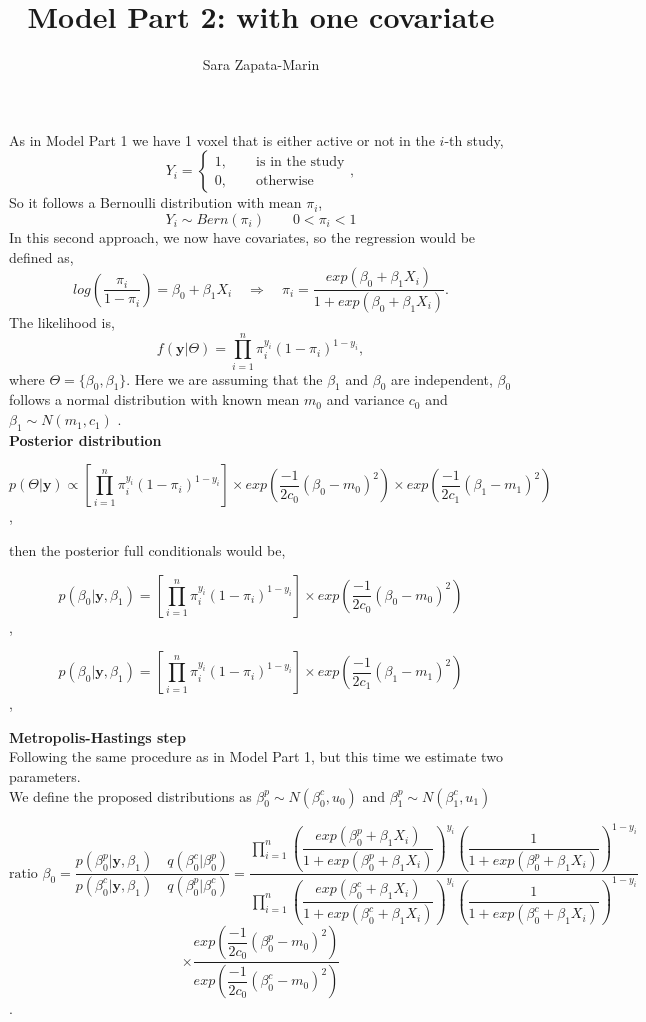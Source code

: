 \documentclass[10pt,a4paper]{article}
\author{Sara Zapata-Marin}
\title{Model Part 2: with one covariate}
\begin{document}
\maketitle

As in Model Part 1 we have  1 voxel that is either active or not in the $i$-th study,
\[ Y_i= 
\begin{cases}
1,\qquad \text{is in the study}\\
0, \qquad \text{otherwise}
\end{cases},
\]
So it follows a Bernoulli distribution with mean $\pi_i$,
\[Y_i \sim Bern(\pi_i) \qquad 0<\pi_i <1\]
In this second approach, we now have covariates, so the regression would be defined as,
\[ log \left(\dfrac{\pi_i}{1-\pi_i} \right)=\beta_0+\beta_1 X_{i} \quad \Rightarrow  \quad \pi_i = \dfrac{exp(\beta_0+\beta_1 X_{i}) }{1+ exp(\beta_0+\beta_1 X_{i} )}. \]
The likelihood is,
\[ f(\textbf{y}| \Theta)=\prod_{i=1}^{n} \pi_i^{y_i}(1-\pi_i)^{1-y_i},\]
where $\Theta =\{ \beta_0, \beta_{1}\}$. Here we are assuming that the $\beta_1$ and $\beta_0$  are independent, $\beta_0$ follows a normal distribution with known mean $m_0$ and variance $c_0$ and $\beta_1 \sim N(m_1, c_1) $ .
\\  \textbf{Posterior distribution} 

\[p(\Theta|\textbf{y})\propto \left[ \prod_{i=1}^{n} \pi_i^{y_i}(1-\pi_i)^{1-y_i} \right] \times exp\left(\dfrac{-1}{2c_0}(\beta_0-m_0)^2\right) \times exp \left( \dfrac{-1}{2c_1} (\beta_1-m_1)^2\right) \],

then the posterior full conditionals would be,

\[p(\beta_0|\textbf{y}, \beta_1)= \left[ \prod_{i=1}^{n} \pi_i^{y_i}(1-\pi_i)^{1-y_i} \right] \times exp\left(\dfrac{-1}{2c_0}(\beta_0-m_0)^2\right)\],

\[p(\beta_0|\textbf{y}, \beta_1)= \left[ \prod_{i=1}^{n} \pi_i^{y_i}(1-\pi_i)^{1-y_i} \right] \times exp\left(\dfrac{-1}{2c_1}(\beta_1-m_1)^2\right)\],

\textbf{Metropolis-Hastings step}
\\Following the same procedure as in Model Part 1, but this time we estimate two parameters.
\\We define the proposed distributions as $\beta_0^p \sim N(\beta_0^c,u_0)$ and $\beta_1^p \sim N(\beta_1^c,u_1)$ 
 
\[ \text{ratio } \beta_0=\dfrac{p(\beta_0^p|\textbf{y}, \beta_1)\quad q(\beta_0^c|\beta_0^p)}{p(\beta_0^c|\textbf{y}, \beta_1) \quad q(\beta_0^p|\beta_0^c)}=\dfrac{\prod_{i=1}^n\left(\dfrac{exp(\beta_0^p + \beta_1 X_i)}{1+exp(\beta_0^p + \beta_1 X_i)}\right)^{y_i}\left( \dfrac{1}{1+exp(\beta_0^p + \beta_1 X_i)}\right)^{1-y_i}}{\prod_{i=1}^n\left(\dfrac{exp(\beta_0^c+ \beta_1 X_i)}{1+exp(\beta_0^c+ \beta_1 X_i)}\right)^{y_i}\left( \dfrac{1}{1+exp(\beta_0^c+ \beta_1 X_i)}\right)^{1-y_i}}\]
\[\times \dfrac{exp\left(\dfrac{-1}{2c_0}(\beta_0^p-m_0)^2\right)}{exp\left(\dfrac{-1}{2c_0}(\beta_0^c-m_0)^2\right)}\].
\end{document}
